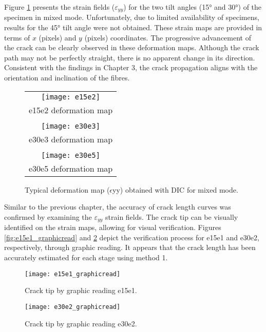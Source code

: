 Figure \ref{fig:Strain_def_mixedmode} presents the strain fields ($\varepsilon_{yy}$) for the two tilt angles (15° and 30°) of the specimen in mixed mode. Unfortunately, due to limited availability of specimens, results for the 45° tilt angle were not obtained. These strain maps are provided in terms of $x$ (pixels) and $y$ (pixels) coordinates. The progressive advancement of the crack can be clearly observed in these deformation maps. Although the crack path may not be perfectly straight, there is no apparent change in its direction. Consistent with the findings in Chapter 3, the crack propagation aligns with the orientation and inclination of the fibres.

\begin{figure}[htp]
	\centering
	\begin{tabular}{c}
		\texttt{[image: e15e2]} \\
		e15e2 deformation map \\
		\\
		\texttt{[image: e30e3]} \\
		e30e3 deformation map \\
		\\
		\texttt{[image: e30e5]} \\
		e30e5 deformation map \\
	\end{tabular}
	\caption{Typical deformation map ($\epsilon$yy) obtained with DIC for mixed mode.}
	\label{fig:Strain_def_mixedmode}
\end{figure}

Similar to the previous chapter, the accuracy of crack length curves was confirmed by examining the $\varepsilon_{yy}$ strain fields. The crack tip can be visually identified on the strain maps, allowing for visual verification. Figures \ref{fig:e15e1_graphicread} and \ref{fig:e30e2_graphicread} depict the verification process for e15e1 and e30e2, respectively, through graphic reading. It appears that the crack length has been accurately estimated for each stage using method 1.

\begin{figure}[htp]
	\begin{minipage}[c]{.46\linewidth}
		\centering
		\texttt{[image: e15e1\_graphicread]}
		\caption{Crack tip by graphic reading e15e1.}
		\label{fig:e15e1_graphicread}
	\end{minipage}
	\hfill%
	\begin{minipage}[c]{.46\linewidth}
		\centering
		\texttt{[image: e30e2\_graphicread]}
		\caption{Crack tip by graphic reading e30e2.}
		\label{fig:e30e2_graphicread}
	\end{minipage}
\end{figure}

